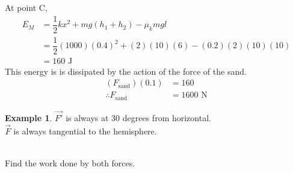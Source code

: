\documentclass[fleqn]{article}
\theoremstyle{definition}
\newtheorem{example}{Example}
\theoremstyle{theorem}
\begin{document}
At point C,
\begin{align*}
	E_M &= \dfrac{1}{2} k x^2 + m g (h_1 + h_2) - \mu_k m g l\\
	&= \dfrac{1}{2}(1000)(0.4)^2 + (2)(10)(6) - (0.2)(2)(10)(10)\\
	&= 160 \text{ J}
\end{align*}
This energy is is dissipated by the action of the force of the sand.
\begin{align*}
	(F_{\text{sand}})(0.1) &= 160 \\
	\therefore F_{\text{sand}} &= 1600 \text{ N}
\end{align*}

\begin{example}
	{\color{blue}$\overrightarrow{F'}$} is always at 30 degrees from horizontal.\\
	{\color{red}$\overrightarrow{F}$} is always tangential to the hemisphere.\\
	\\
	Find the work done by both forces.
\end{example}
\end{document}
